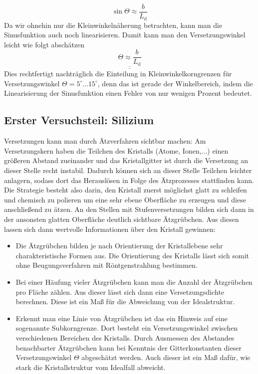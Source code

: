 \documentclass[german,  %
parskip=full,  %
]{scrartcl}
\begin{document}
\[\sin\Theta \approx \frac{b}{L_{\mathrm{d}}}\]
Da wir ohnehin nur die Kleinwinkelnäherung betrachten, kann man die Sinusfunktion auch noch linearisieren. Damit kann man den Versetzungswinkel leicht wie folgt abschätzen
\[\underline{\underline{\Theta \approx \frac{b}{L_{\mathrm{d}}}}}\]
Dies rechtfertigt nachträglich die Einteilung in Kleinwinkelkorngrenzen für Versetzungswinkel \(\Theta = 5^{\circ} \hdots 15^{\circ}\), denn das ist gerade der Winkelbereich, indem die Linearisierung der Sinusfunktion einen Fehler von nur wenigen Prozent bedeutet.

\subsection{Erster Versuchsteil: Silizium}
Versetzungen kann man durch Ätzverfahren sichtbar machen: Am Versetzungskern haben die Teilchen des Kristalls (Atome, Ionen,...) einen größeren Abstand zueinander und das Kristallgitter ist durch die Versetzung an dieser Stelle recht instabil. Dadurch können sich an dieser Stelle Teilchen leichter anlagern, sodass dort das Herauslösen in Folge des Ätzprozesses stattfinden kann. Die Strategie besteht also darin, den Kristall zuerst möglichst glatt zu schleifen und chemisch zu polieren um eine sehr ebene Oberfläche zu erzeugen und diese anschließend zu ätzen. An den Stellen mit Stufenversetzungen bilden sich dann in der ansonsten glatten Oberfläche deutlich sichtbare Ätzgrübchen. Aus diesen lassen sich dann wertvolle Informationen über den Kristall gewinnen:
\begin{itemize}
\item Die Ätzgrübchen bilden je nach Orientierung der Kristallebene sehr charakteristische Formen aus. Die Orientierung des Kristalls lässt sich somit ohne Beugungsverfahren mit Röntgenstrahlung bestimmen.
\item Bei einer Häufung vieler Ätzgrübchen kann man die Anzahl der Ätzgrübchen pro Fläche zählen. Aus dieser lässt sich dann eine Versetzungsdichte berechnen. Diese ist ein Maß für die Abweichung von der Idealstruktur.
\item Erkennt man eine Linie von Ätzgrübchen ist das ein Hinweis auf eine sogenannte Subkorngrenze. Dort besteht ein Versetzungswinkel zwischen verschiedenen Bereichen des Kristalls.  Durch Ausmessen des Abstandes benachbarter Ätzgrübchen kann bei Kenntnis der Gitterkonstanten dieser Versetzungswinkel \(\Theta\) abgeschätzt werden. Auch dieser ist ein Maß dafür, wie stark die Kristallstruktur vom Idealfall abweicht.
\end{itemize}
\end{document}
